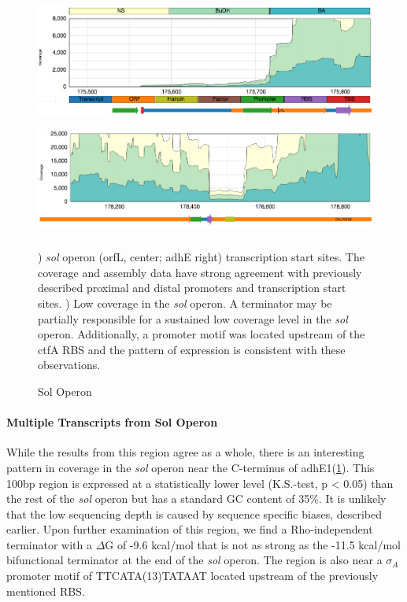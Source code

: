 \begin{figure}
\small
{\includegraphics[width=\textwidth,height=1.5in]{images/Assembly/Examples/Sol/Sol-TSS.png}
\label{fig:5.11a}}
{\includegraphics[width=\textwidth,height=1.5in]{images/Assembly/Examples/Sol/AdhE-terminator.png}
\label{fig:5.11b}}
\caption{Sol Operon}
) \textit{sol} operon (orfL, center; adhE right) transcription start sites. The coverage and assembly data have strong agreement with previously described proximal and distal promoters and transcription start sites. ) Low coverage in the \textit{sol} operon. A terminator may be partially responsible for a sustained low coverage level in the \textit{sol} operon. Additionally, a promoter motif was located upstream of the ctfA RBS and the pattern of expression is consistent with these observations.
\end{figure}

\paragraph{Multiple Transcripts from Sol Operon}
While the results from this region agree as a whole, there is an interesting pattern in coverage in the \textit{sol} operon near the C-terminus of adhE1(\ref{fig:5.11b}). This 100bp region is expressed at a statistically lower level (K.S.-test, p < 0.05) than the rest of the \textit{sol} operon but has a standard GC content of 35\%. It is unlikely that the low sequencing depth is caused by sequence specific biases, described earlier. Upon further examination of this region, we find a Rho-independent terminator with a \(\Delta\)G of -9.6 kcal/mol that is not as strong as the -11.5 kcal/mol bifunctional terminator at the end of the \textit{sol} operon. The region is also near a $\sigma_{A}$ promoter motif of TTCATA(13)TATAAT located upstream of the previously mentioned RBS. 

